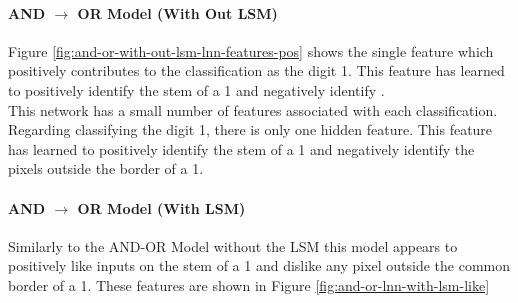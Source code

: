 \begin{minipage}[t]{0.45\textwidth}
\paragraph{AND $\rightarrow$ OR Model (With Out LSM)}
	Figure \ref{fig:and-or-with-out-lsm-lnn-features-pos} shows the single feature which positively contributes to the classification as the digit 1. This feature has learned to positively identify the stem of a 1 and negatively identify .\\
		
	This network has a small number of features associated with each classification. Regarding classifying the digit 1, there is only one hidden feature. This feature has learned to positively identify the stem of a 1 and negatively identify the pixels outside the border of a 1.\\

\paragraph{AND $\rightarrow$ OR Model (With LSM)}
	Similarly to the AND-OR Model without the LSM this model appears to positively like inputs on the stem of a 1 and dislike any pixel outside the common border of a 1. These features are shown in Figure \ref{fig:and-or-lnn-with-lsm-like}
\end{minipage}
\hspace{0.05\textwidth}
